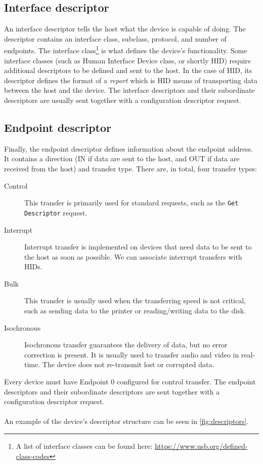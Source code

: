 \subsection*{Interface descriptor}
An interface descriptor tells the host what the device is capable of doing. The descriptor contains an interface class, subclass, protocol, and number of endpoints. The interface class\footnote{A list of interface classes can be found here: \url{https://www.usb.org/defined-class-codes}} is what defines the device's functionality. Some interface classes (such as Human Interface Device class, or shortly HID) require additional descriptors to be defined and sent to the host. In the case of HID, its descriptor defines the format of a \emph{report} which is HID means of transporting data between the host and the device. The interface descriptors and their subordinate descriptors are usually sent together with a configuration descriptor request.

\subsection*{Endpoint descriptor}
Finally, the endpoint descriptor defines information about the endpoint address. It contains a direction (IN if data are sent to the host, and OUT if data are received from the host) and transfer type. There are, in total, four transfer types:
\begin{description}
    \item [Control] This transfer is primarily used for standard requests, such as the \verb|Get Descriptor| request.
    \item [Interrupt] Interrupt transfer is implemented on devices that need data to be sent to the host as soon as possible. We can associate interrupt transfers with HIDs.
    \item [Bulk] This transfer is usually used when the transferring speed is not critical, such as sending data to the printer or reading/writing data to the disk.
    \item [Isochronous] Isochronous transfer guarantees the delivery of data, but no error correction is present. It is usually used to transfer audio and video in real-time. The device does not re-transmit lost or corrupted data.
\end{description}
Every device must have Endpoint 0 configured for control transfer. The endpoint descriptors and their subordinate descriptors are sent together with a configuration descriptor request.
\\ \\
An example of the device's descriptor structure can be seen in \autoref{fig:descriptors}.


